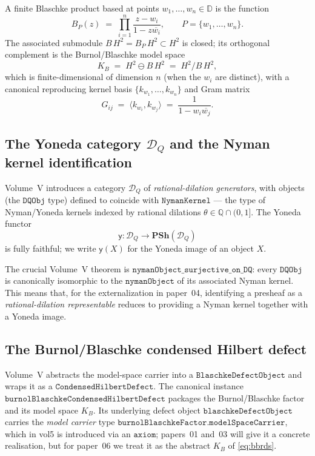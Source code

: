 \documentclass[12pt]{article}
\theoremstyle{plain}
\theoremstyle{definition}
\theoremstyle{remark}
\newcommand{\Q}{\mathbb{Q}}
\newcommand{\D}{\mathbb{D}}
\newcommand{\HardyTwo}{H^{2}}
\newcommand{\KB}{K_{B}}
\newcommand{\BHardy}{B\,\HardyTwo}
\newcommand{\DQ}{\mathcal{D}_{Q}}
\newcommand{\Yon}{\mathsf{y}}
\begin{document}
A finite Blaschke product based at points
\(w_{1},\ldots,w_{n} \in \D\) is the function
\[
  B_{P}(z) \;=\; \prod_{i=1}^{n} \frac{z - w_{i}}{1 - z\overline{w_{i}}},
  \qquad P = \{w_{1},\ldots,w_{n}\}.
\]
The associated submodule \(\BHardy = B_{P}\,\HardyTwo \subset \HardyTwo\)
is closed; its orthogonal complement is the Burnol/Blaschke model space
\[
  \KB \;=\; \HardyTwo \ominus \BHardy
       \;=\; \HardyTwo / \BHardy,
\]
which is finite-dimensional of dimension \(n\) (when the \(w_{i}\) are
distinct), with a canonical reproducing kernel basis
\(\{k_{w_{1}},\ldots,k_{w_{n}}\}\) and Gram matrix
\[
  G_{ij} \;=\; \langle k_{w_{i}}, k_{w_{j}}\rangle
            \;=\; \frac{1}{1 - w_{i}\overline{w_{j}}}.
\]

\subsection{The Yoneda category \texorpdfstring{\(\DQ\)}{D Q} and
the Nyman kernel identification}

Volume~V introduces a category \(\DQ\) of \emph{rational-dilation
generators}, with objects (the \(\mathtt{DQObj}\) type) defined to
coincide with \(\mathtt{NymanKernel}\) — the type of Nyman/Yoneda
kernels indexed by rational dilations \(\theta \in \Q \cap (0, 1]\).
The Yoneda functor
\[
  \Yon : \DQ \to \mathbf{PSh}(\DQ)
\]
is fully faithful; we write \(\Yon(X)\) for the Yoneda image of an
object \(X\).

The crucial Volume~V theorem is
\(\mathtt{nymanObject\_surjective\_on\_DQ}\): every
\(\mathtt{DQObj}\) is canonically isomorphic to the
\(\mathtt{nymanObject}\) of its associated Nyman kernel. This means
that, for the externalization in paper~04, identifying a presheaf as a
\emph{rational-dilation representable} reduces to providing a Nyman
kernel together with a Yoneda image.

\subsection{The Burnol/Blaschke condensed Hilbert defect}

Volume~V abstracts the model-space carrier into a
\(\mathtt{BlaschkeDefectObject}\) and wraps it as a
\(\mathtt{CondensedHilbertDefect}\). The canonical instance
\(\mathtt{burnolBlaschkeCondensedHilbertDefect}\) packages the
Burnol/Blaschke factor and its model space \(\KB\). Its underlying
defect object \(\mathtt{blaschkeDefectObject}\) carries the
\emph{model carrier} type
\(\mathtt{burnolBlaschkeFactor.modelSpaceCarrier}\), which in vol5 is
introduced via an \(\mathtt{axiom}\); papers~01 and~03 will give it a
concrete realisation, but for paper~06 we treat it as the abstract
\(\KB\) of \eqref{eq:bbrds}.
\end{document}

